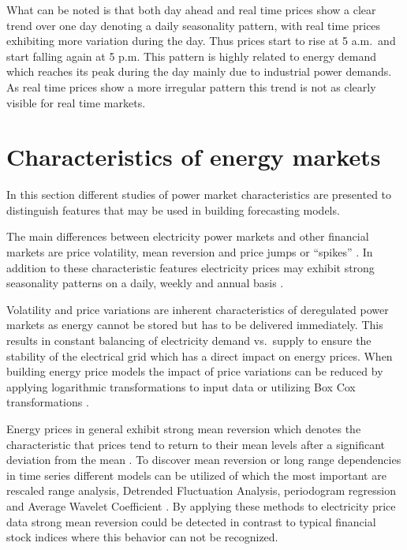 What can be noted is that both day ahead and real time prices show a clear trend over one day denoting a daily seasonality pattern, with real time prices exhibiting more variation during the day. Thus prices start to rise at 5 a.m.~and start falling again at 5 p.m. This pattern is highly related to energy demand which reaches its peak during the day mainly due to industrial power demands. As real time prices show a more irregular pattern this trend is not as clearly visible for real time markets. 




\section{Characteristics of energy markets}

In this section different studies of power market characteristics are presented to distinguish features that may be used in building forecasting models. 


The main differences between electricity power markets and other financial markets are price volatility, mean reversion and price jumps or "`spikes"' \cite{weron2007modeling,weron2008market,weron2004modelingmarkets}. In addition to these characteristic features electricity prices may exhibit strong seasonality patterns on a daily, weekly and annual basis \cite{weron2004modelingmarkets}. 

Volatility and price variations are inherent characteristics of deregulated power markets as energy cannot be stored but has to be delivered immediately. This results in constant balancing of electricity demand vs.~supply to ensure the stability of the electrical grid which has a direct impact on energy prices. When building energy price models the impact of price variations can be reduced by applying logarithmic transformations to input data or utilizing Box Cox transformations \cite{weron2005forecasting, box1964analysis}. 


Energy prices in general exhibit strong mean reversion which denotes the characteristic that prices tend to return to their mean levels after a significant deviation from the mean \cite{weron2004modelingmarkets,weron2007modeling}. To discover mean reversion or long range dependencies in time series different models can be utilized of which the most important are rescaled range analysis, Detrended Fluctuation Analysis, periodogram regression and Average Wavelet Coefficient \cite{weron2007modeling}. By applying these methods to electricity price data strong mean reversion could be detected in contrast to typical financial stock indices where this behavior can not be recognized. 


